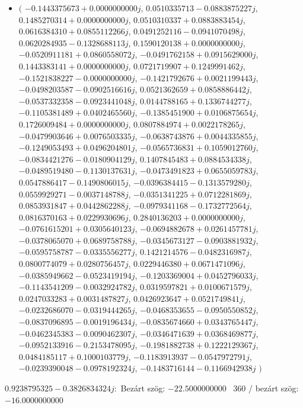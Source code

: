 \documentclass[14pt,a4paper]{article}
\begin{document}
\begin{itemize}
\item
$\big($
$-0.1443375673+0.0000000000j$, $0.0510335713-0.0883875227j$, $0.1485270314+0.0000000000j$, $0.0510310337+0.0883883454j$, $0.0616384310+0.0855112266j$, $0.0491252116-0.0941070498j$, $0.0620284935-0.1328688113j$, $0.1590120138+0.0000000000j$, $-0.0520911181+0.0860558072j$, $-0.0491762158+0.0915629000j$, $0.1443383141+0.0000000000j$, $0.0721719907+0.1249991462j$, $-0.1521838227-0.0000000000j$, $-0.1421792676+0.0021199443j$, $-0.0498203587-0.0902516616j$, $0.0521362659+0.0858886442j$, $-0.0537332358-0.0923441048j$, $0.0144788165+0.1336744277j$, $-0.1105381489+0.0402465560j$, $-0.1385451900+0.0106875654j$, $0.1726009484+0.0000000000j$, $0.0807884974+0.0022178265j$, $-0.0479903646+0.0076503335j$, $-0.0638743876+0.0044335855j$, $-0.1249053493+0.0496204801j$, $-0.0565736831+0.1059012760j$, $-0.0834421276-0.0180904129j$, $0.1407845483+0.0884534338j$, $-0.0489519480-0.1130137631j$, $-0.0473491823+0.0655059783j$, $0.0547886417-0.1490806015j$, $-0.0396384415-0.1313579280j$, $0.0559929271-0.0037148788j$, $-0.0351341225+0.0712281869j$, $0.0853931847+0.0442862288j$, $-0.0979341168-0.1732772564j$, $0.0816370163+0.0229930696j$, $0.2840136203+0.0000000000j$, $-0.0761615201+0.0305640123j$, $-0.0694882678+0.0261457781j$, $-0.0378065070+0.0689758788j$, $-0.0345673127-0.0903881932j$, $-0.0595758787-0.0335556277j$, $0.1421214576-0.0482316987j$, $0.0800774079+0.0280756457j$, $0.0229446380+0.0671471096j$, $-0.0385949662-0.0523419194j$, $-0.1203369004+0.0452796033j$, $-0.1143541209-0.0032924782j$, $0.0319597821+0.0100671579j$, $0.0247033283+0.0031487827j$, $0.0426923647+0.0521749841j$, $-0.0232686070-0.0319444265j$, $-0.0468353655-0.0950550852j$, $-0.0837096895-0.0019196434j$, $-0.0835674660+0.0343765447j$, $-0.0462345383-0.0090462307j$, $-0.0346471639+0.0368469877j$, $-0.0952133916-0.2153478095j$, $-0.1981882738+0.1222129367j$, $0.0484185117+0.1000103779j$, $-0.1183913937-0.0547972791j$, $-0.0239390048-0.0978192324j$, $-0.1483716144-0.1166942938j$
$\big)$
\end{itemize}
$0.9238795325-0.3826834324j$:\
Bezárt szög: $-22.5000000000$ \
360 / bezárt szög: $-16.0000000000$\
\end{document}
